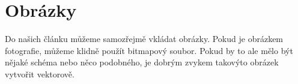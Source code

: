 \documentclass[a4paper,11pt]{article}
\begin{document}
\section{Obrázky}
Do našich článku můžeme samozřejmě vkládat obrázky. Pokud je obrázkem fotografie, můžeme klidně použít bitmapový soubor. Pokud by to ale mělo být nějaké schéma nebo něco podobného, je dobrým zvykem takovýto obrázek vytvořit vektorově.

\begin{figure}[ht]
  \begin{center}
\end{center}
\end{figure}
\end{document}
